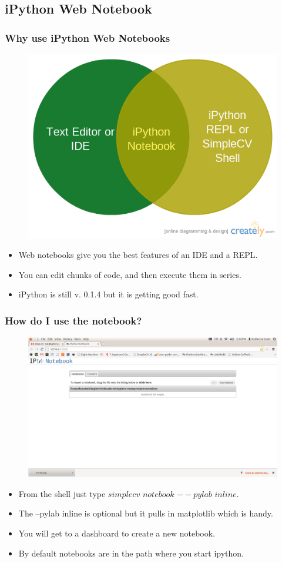 \documentclass{beamer}
\begin{document}
\subsection{iPython Web Notebook}
\begin{frame}
\frametitle{Why use iPython Web Notebooks}
\begin{figure}
  \includegraphics[width=0.7\linewidth]{venn.png}
\end{figure}
\begin{itemize}
\item Web notebooks give you the best features of an IDE and a REPL.
\item You can edit chunks of code, and then execute them in series.
\item iPython is still v. 0.1.4 but it is getting good fast.
\end{itemize}
\end{frame}
\begin{frame}
\frametitle{How do I use the notebook?}
\begin{figure}
  \includegraphics[width=0.5\linewidth]{startingipython.png}
\end{figure}
\begin{itemize}
\item From the shell just type $simplecv$ $notebook$ $--pylab$
  $inline$.
\item The --pylab inline is optional but it pulls in matplotlib which
  is handy.
\item You will get to a dashboard to create a new notebook.
\item By default notebooks are in the path where you start ipython.
\end{itemize}
\end{frame}
\end{document}
